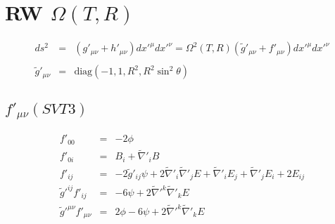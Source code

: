 \documentclass[10pt,letterpaper]{article}
\numberwithin{equation}{section}
\begin{document}
\section{RW $\Omega(T,R)$}
\begin{eqnarray}
ds^2 &=& (g'_{\mu\nu} + h'_{\mu\nu})dx'^\mu dx'^\nu = \Omega^2(T,R)(\tilde g'_{\mu\nu} + f'_{\mu\nu})dx'^\mu dx'^\nu
\\ \nonumber\\
\tilde g'_{\mu\nu} &=& \text{diag}\left(-1,1,R^2,R^2\sin^2\theta\right)
\end{eqnarray}
%
\subsection{$f'_{\mu\nu}(SVT3)$}
\begin{eqnarray}
f'_{00} &=& -2\phi
\nonumber\\
f'_{0i} &=& B_i + \tilde\nabla'_i B
\nonumber\\
f'_{ij} &=& -2\tilde g'_{ij} \psi + 2\tilde\nabla'_i\tilde\nabla'_j E + \tilde\nabla'_i E_j + \tilde\nabla'_j E_i + 2E_{ij}
\nonumber\\
\tilde g'^{ij} f'_{ij} &=& -6\psi + 2\tilde\nabla'^k\tilde\nabla'_k E
\nonumber\\
\tilde g'^{\mu\nu} f'_{\mu\nu} &=& 2\phi-6\psi + 2\tilde\nabla'^k\tilde\nabla'_k E
\end{eqnarray}
%
\end{document}
